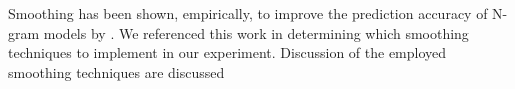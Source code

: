 \documentclass[ai15_group61_report.tex]{subfiles}
\begin{document}

Smoothing has been shown, empirically, to improve the prediction accuracy of N-gram models by \cite{chen-smoothing}. We referenced this work in determining which smoothing techniques to implement in our experiment. Discussion of the employed smoothing techniques are discussed 

\end{document}
